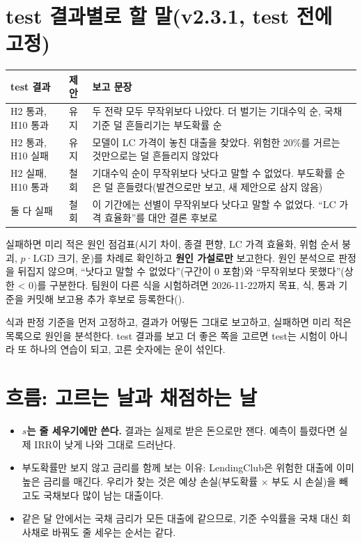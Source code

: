 \section{test 결과별로 할 말(v2.3.1, test 전에 고정)}
\begin{table}[H]\centering\small
\begin{tabularx}{\linewidth}{@{}p{30mm}p{12mm}L@{}}\toprule
test 결과 & 제안 & 보고 문장\\\midrule
H2 통과, H10 통과 & 유지 & 두 전략 모두 무작위보다 나았다. 더 벌기는 기대수익 순, 국채 기준 덜 흔들리기는 부도확률 순\\
H2 통과, H10 실패 & 유지 & 모델이 LC 가격이 놓친 대출을 찾았다. 위험한 20\%를 거르는 것만으로는 덜 흔들리지 않았다\\
H2 실패, H10 통과 & 철회 & 기대수익 순이 무작위보다 낫다고 말할 수 없었다. 부도확률 순은 덜 흔들렸다(발견으로만 보고, 새 제안으로 삼지 않음)\\
둘 다 실패 & 철회 & 이 기간에는 선별이 무작위보다 낫다고 말할 수 없었다. ``LC 가격 효율화''를 대안 결론 후보로\\\bottomrule
\end{tabularx}
\end{table}
실패하면 미리 적은 원인 점검표(시기 차이, 종결 편향, LC 가격 효율화, 위험 순서 붕괴, $p$·\allowbreak{}LGD 크기, 운)를 차례로 확인하고 \textbf{원인 가설로만} 보고한다. 원인 분석으로 판정을 뒤집지 않으며, ``낫다고 말할 수 없었다''(구간이 0 포함)와 ``무작위보다 못했다''(상한 < 0)를 구분한다. 팀원이 다른 식을 시험하려면 2026-11-22까지 목표, 식, 통과 기준을 커밋해 보고용 추가 후보로 등록한다().

\begin{warnbox}[연구로서의 태도]
식과 판정 기준을 먼저 고정하고, 결과가 어떻든 그대로 보고하고, 실패하면 미리 적은 목록으로 원인을 분석한다. test 결과를 보고 더 좋은 쪽을 고르면 test는 시험이 아니라 또 하나의 연습이 되고, 고른 숫자에는 운이 섞인다.
\end{warnbox}

\section{흐름: 고르는 날과 채점하는 날}


\begin{itemize}[leftmargin=*]
\item \textbf{$s$는 줄 세우기에만 쓴다.} 결과는 실제로 받은 돈으로만 잰다. 예측이 틀렸다면 실제 IRR이 낮게 나와 그대로 드러난다.
\item 부도확률만 보지 않고 금리를 함께 보는 이유: LendingClub은 위험한 대출에 이미 높은 금리를 매긴다. 우리가 찾는 것은 예상 손실(부도확률 $\times$ 부도 시 손실)을 빼고도 국채보다 많이 남는 대출이다.
\item 같은 달 안에서는 국채 금리가 모든 대출에 같으므로, 기준 수익률을 국채 대신 회사채로 바꿔도 줄 세우는 순서는 같다.
\end{itemize}

